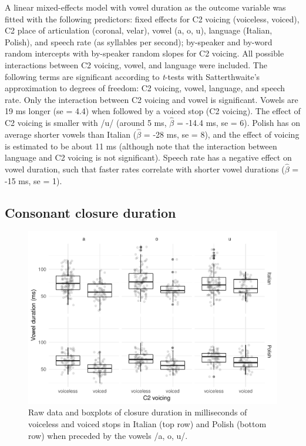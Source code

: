 \documentclass[preprint]{JASAnew}
\begin{document}
A linear mixed-effects model with vowel duration as the outcome variable
was fitted with the following predictors: fixed effects for C2 voicing
(voiceless, voiced), C2 place of articulation (coronal, velar), vowel
(a, o, u), language (Italian, Polish), and speech rate (as syllables per
second); by-speaker and by-word random intercepts with by-speaker random
slopes for C2 voicing. All possible interactions between C2 voicing,
vowel, and language were included. The following terms are significant
according to \emph{t}-tests with Satterthwaite's approximation to
degrees of freedom: C2 voicing, vowel, language, and speech rate. Only
the interaction between C2 voicing and vowel is significant. Vowels are
19 ms longer (se = 4.4) when followed by a voiced stop (C2 voicing). The
effect of C2 voicing is smaller with /u/ (around 5 ms, \(\hat{\beta}\) =
-14.4 ms, se = 6). Polish has on average shorter vowels than Italian
(\(\hat{\beta}\) = -28 ms, se = 8), and the effect of voicing is
estimated to be about 11 ms (although note that the interaction between
language and C2 voicing is not significant). Speech rate has a negative
effect on vowel duration, such that faster rates correlate with shorter
vowel durations (\(\hat{\beta}\) = -15 ms, se = 1).

\subsection{Consonant closure
duration}\label{consonant-closure-duration}

\label{s:cduration}

\begin{figure}
\includegraphics[width=\linewidth]{Figure3} \caption{Raw data and boxplots of closure duration in milliseconds of voiceless and voiced stops in Italian (top row) and Polish (bottom row) when preceded by the vowels /a, o, u/.}\label{f:Figure3}
\end{figure}
\end{document}
